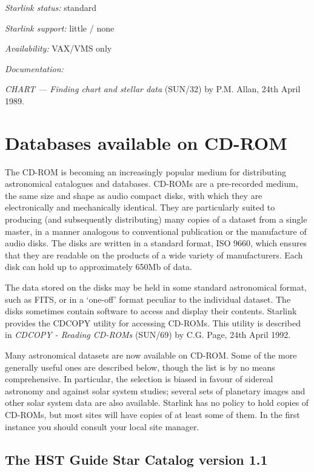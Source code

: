 \documentclass[twoside,11pt]{article}
\newcommand{\xref}[3]{#1}
\newcommand{\xlabel}[1]{}
\begin{document}
{\it Starlink status:} standard

{\it Starlink support:} little / none

{\it Availability:} VAX/VMS only

{\it Documentation:}

{\it CHART --- Finding chart and stellar data}
(\xref{SUN/32}{sun32}{}) by P.M. Allan,
24th April 1989.


\section{Databases available on CD-ROM
\xlabel{databases_available_on_cdrom}}

The CD-ROM is becoming an increasingly popular medium for distributing 
astronomical catalogues and databases. CD-ROMs are a pre-recorded
medium, the same size and shape as audio compact disks, with which they 
are electronically and mechanically identical. They are particularly 
suited to producing (and subsequently distributing) many copies of a 
dataset from a single master, in a manner analogous to conventional 
publication or the manufacture of audio disks. The disks are written 
in a standard format, ISO 9660, which ensures that they are readable 
on the products of a wide variety of manufacturers. Each disk can hold 
up to approximately 650Mb of data.

The data stored on the disks may be held in some standard astronomical 
format, such as FITS, or in a `one-off' format peculiar to the
individual dataset. The disks sometimes contain software to access and
display their contents. Starlink provides the CDCOPY utility for 
accessing CD-ROMs. This utility is described in {\it CDCOPY - Reading 
CD-ROMs}
(SUN/69) by C.G. Page, 24th April 1992.

Many astronomical datasets are now available on CD-ROM. Some of the more
generally useful ones are described below, though the list is by no 
means comprehensive. In particular, the selection is biased in favour of
sidereal astronomy and against solar system studies; several sets of 
planetary images and other solar system data are also available. 
Starlink has no policy to hold copies of CD-ROMs, but most sites will
have copies of at least some of them. In the first instance you should
consult your local site manager.

\subsection{The HST Guide Star Catalog version 1.1
\xlabel{the_hst_guide_star_catalog_version_11}\label{GSC}}
\end{document}
